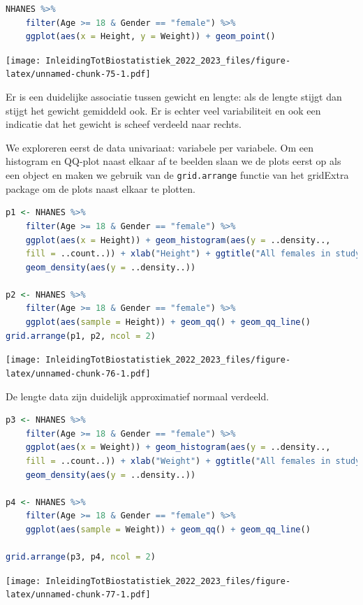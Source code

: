 \documentclass[
  12pt,dutch,coursenotes]{book}
\newcommand{\passthrough}[1]{#1}
\begin{document}
\begin{lstlisting}[language=R]
NHANES %>%
    filter(Age >= 18 & Gender == "female") %>%
    ggplot(aes(x = Height, y = Weight)) + geom_point()
\end{lstlisting}

\texttt{[image: InleidingTotBiostatistiek\_2022\_2023\_files/figure-latex/unnamed-chunk-75-1.pdf]}

Er is een duidelijke associatie tussen gewicht en lengte: als de lengte stijgt dan stijgt het gewicht gemiddeld ook. Er is echter veel variabiliteit en ook een indicatie dat het gewicht is scheef verdeeld naar rechts.

We exploreren eerst de data univariaat: variabele per variabele. Om een histogram en QQ-plot naast elkaar af te beelden slaan we de plots eerst op als een object en maken we gebruik van de \passthrough{\lstinline!grid.arrange!} functie van het gridExtra package om de plots naast elkaar te plotten.

\begin{lstlisting}[language=R]
p1 <- NHANES %>%
    filter(Age >= 18 & Gender == "female") %>%
    ggplot(aes(x = Height)) + geom_histogram(aes(y = ..density..,
    fill = ..count..)) + xlab("Height") + ggtitle("All females in study") +
    geom_density(aes(y = ..density..))

p2 <- NHANES %>%
    filter(Age >= 18 & Gender == "female") %>%
    ggplot(aes(sample = Height)) + geom_qq() + geom_qq_line()
grid.arrange(p1, p2, ncol = 2)
\end{lstlisting}

\texttt{[image: InleidingTotBiostatistiek\_2022\_2023\_files/figure-latex/unnamed-chunk-76-1.pdf]}

De lengte data zijn duidelijk approximatief normaal verdeeld.

\begin{lstlisting}[language=R]
p3 <- NHANES %>%
    filter(Age >= 18 & Gender == "female") %>%
    ggplot(aes(x = Weight)) + geom_histogram(aes(y = ..density..,
    fill = ..count..)) + xlab("Weight") + ggtitle("All females in study") +
    geom_density(aes(y = ..density..))

p4 <- NHANES %>%
    filter(Age >= 18 & Gender == "female") %>%
    ggplot(aes(sample = Weight)) + geom_qq() + geom_qq_line()

grid.arrange(p3, p4, ncol = 2)
\end{lstlisting}

\texttt{[image: InleidingTotBiostatistiek\_2022\_2023\_files/figure-latex/unnamed-chunk-77-1.pdf]}
\end{document}
